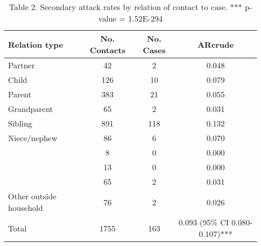       
\begin{table}[!hb]
    \begin{tabular}{@{}lccc@{}}
    \toprule
    Relation type & No. Contacts & No. Cases & ARcrude \\
    \cmidrule
    Partner & 42 & 2 & 0.048 \\ 
    Child & 126 & 10 & 0.079 \\                  
    Parent & 383 & 21 & 0.055 \\
    Grandparent & 65       & 2     & 0.031 \\
    Sibling & 891      & 118   & 0.132 \\
    Niece/nephew & 86       & 6     & 0.070 \\
    ~   & 8        & 0     & 0.000 \\
    ~   & 13       & 0     & 0.000  \\
    ~   & 65       & 2     & 0.031  \\
    Other outside household & 76 & 2 & 0.026 \\
    Total & 1755 & 163 & 0.093 (95\% CI 0.080-0.107)*** \\
    \bottomrule
    \end{tabular}
    \caption{Table 2. Secondary attack rates by relation of contact to case. *** p-value = 1.52E-294}
    \label{table2}
\end{table}


